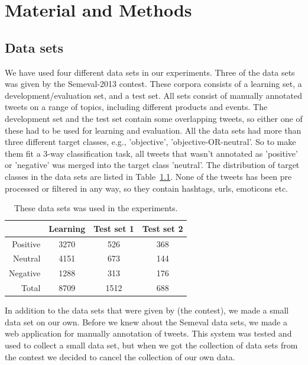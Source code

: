 \chapter{Material and Methods}

\section{Data sets}
We have used four different data sets in our experiments. Three of the data sets was given by the Semeval-2013 contest. These corpora consists of a learning set, a development/evaluation set, and a test set. All sets consist of manually annotated tweets on a range of topics, including different products and events. The development set and the test set contain some overlapping tweets, so either one of these had to be used for learning and evaluation. All the data sets had more than three different target classes, e.g., 'objective', 'objective-OR-neutral'. So to make them fit a 3-way classification task, all tweets that wasn't annotated as 'positive' or 'negative' was merged into the target class 'neutral'. The distribution of target classes in the data sets are listed in Table~\ref{tab:data_sets}. None of the tweets has been pre processed or filtered in any way, so they contain hashtags, urls, emoticons etc.

\begin{table}[htb]
\centering
\begin{tabular}{|r||c|c|c|} 
\cline{2-4}
\multicolumn{1}{c|}{ } & \textbf{Learning} & \textbf{Test set 1} &\textbf{Test set 2} \\ \hline
Positive & 3270 & 526 & 368 \\ \hline
Neutral  & 4151 & 673 & 144 \\ \hline
Negative & 1288 & 313 & 176 \\ \hline
Total & 8709 & 1512 & 688 \\ \hline

\end{tabular}
\caption{These data sets was used in the experiments.}
\label{tab:data_sets}
\end{table}

In addition to the data sets that were given by (the contest), we made a small data set on our own. Before we knew about the Semeval data sets, we made a web application for manually annotation of tweets. This system was tested and used to collect a small data set, but when we got the collection of data sets from the contest we decided to cancel the collection of our own data.

